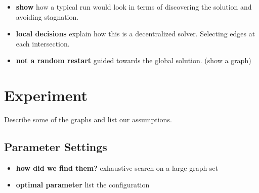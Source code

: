 \begin{itemize}
    \item[] \textbf{show} how a typical run would look in terms of discovering the solution and avoiding stagnation.
    \item[] \textbf{local decisions} explain how this is a decentralized solver. Selecting edges at each intersection.
    \item[] \textbf{not a random restart} guided towards the global solution. (show a graph)
\end{itemize}

%


\section{Experiment}
Describe some of the graphs and list our assumptions.

\subsection{Parameter Settings}
\begin{itemize}
    \item[] \textbf{how did we find them?} exhaustive search on a large graph set
    \item[] \textbf{optimal parameter} list the configuration
\end{itemize}